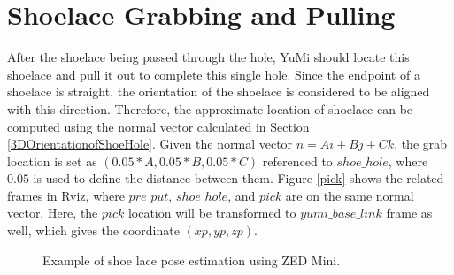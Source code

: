\section{Shoelace Grabbing and Pulling} \label{shoelacegrabbing}
After the shoelace being passed through the hole, YuMi should locate this shoelace and pull it out to complete this single hole. Since the endpoint of a shoelace is straight, the orientation of the shoelace is considered to be aligned with this direction. Therefore, the approximate location of shoelace can be computed using the normal vector calculated in Section \ref{3DOrientationofShoeHole}. Given the normal vector $n = Ai + Bj + Ck$, the grab location is set as $(0.05*A, 0.05*B, 0.05*C)$ referenced to $shoe\_hole$, where $0.05$ is used to define the distance between them. Figure \ref{pick} shows the related frames in Rviz, where $pre\_put$, $shoe\_hole$, and $pick$ are on the same normal vector. Here, the $pick$ location will be transformed to $yumi\_base\_link$ frame as well, which gives the coordinate $(xp, yp, zp)$.

\begin{figure}[H]
\centering
{}
\caption{Example of shoe lace pose estimation using ZED Mini.}
\end{figure}

